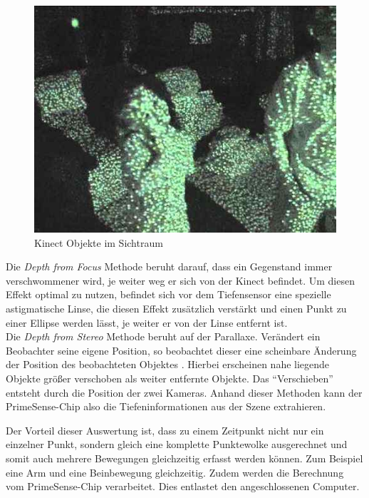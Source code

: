 	
	\begin{figure}[H]						
		\centering							
		\includegraphics[scale=0.5]{Bilder/kinect_dots_green.jpg}			
		\caption{Kinect Objekte im Sichtraum}						
		\label{f:kinect_dots_with_Object}						
	\end{figure}
	
	\noindent
Die \textit{Depth from Focus} Methode beruht darauf, dass ein Gegenstand immer verschwommener wird, je weiter weg er sich von der Kinect befindet. Um diesen Effekt optimal zu nutzen, befindet sich vor dem Tiefensensor eine spezielle astigmatische Linse, die diesen Effekt zusätzlich verstärkt und einen Punkt zu einer Ellipse werden lässt, je weiter er von der Linse entfernt ist.\cite{pdf:maccormick}	\\
Die \textit{Depth from Stereo} Methode beruht auf der Parallaxe. Verändert ein Beobachter seine eigene Position, so beobachtet dieser eine scheinbare Änderung der Position des beobachteten Objektes \cite{pdf:parallaxe}. Hierbei erscheinen nahe liegende Objekte größer verschoben als weiter entfernte Objekte. Das "`Verschieben"' entsteht durch die Position der zwei Kameras. Anhand dieser Methoden kann der PrimeSense-Chip also die Tiefeninformationen aus der Szene extrahieren.	
	
Der Vorteil dieser Auswertung ist, dass zu einem Zeitpunkt nicht nur ein einzelner Punkt, sondern gleich eine komplette Punktewolke ausgerechnet und somit auch mehrere Bewegungen gleichzeitig erfasst werden können. Zum Beispiel eine Arm und eine Beinbewegung gleichzeitig. Zudem werden die Berechnung vom PrimeSense-Chip verarbeitet. Dies entlastet den angeschlossenen Computer.
	
